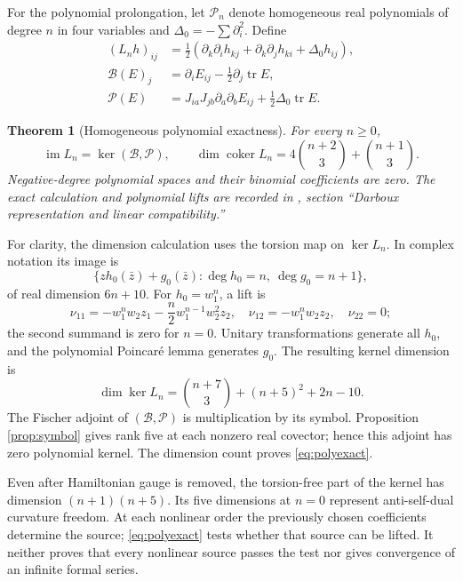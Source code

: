 \documentclass[11pt,a4paper]{article}
\newtheorem{inputtheorem}[theorem]{Theorem}
\theoremstyle{definition}
\theoremstyle{remark}
\newcommand{\tr}{\operatorname{tr}}
\newcommand{\p}{\partial}
\begin{document}
For the polynomial prolongation, let $\mathcal P_n$ denote homogeneous real polynomials of degree $n$ in four variables and $\Delta_0=-\sum\p_i^2$. Define
\begin{align*}
 (L_nh)_{ij}&=\frac12(\p_k\p_i h_{kj}+\p_k\p_jh_{ki}+\Delta_0h_{ij}),\\
 \mathscr B(E)_j&=\p_iE_{ij}-\tfrac12\p_j\tr E,\\
 \mathscr P(E)&=J_{ia}J_{jb}\p_a\p_bE_{ij}+\tfrac12\Delta_0\tr E.
\end{align*}
\begin{inputtheorem}[Homogeneous polynomial exactness]\label{input:polynomial}
For every $n\ge0$,
\begin{equation}\label{eq:polyexact}
 \operatorname{im}L_n=\ker(\mathscr B,\mathscr P),\qquad
 \dim\operatorname{coker}L_n=4\binom{n+2}{3}+\binom{n+1}{3}.
\end{equation}
Negative-degree polynomial spaces and their binomial coefficients are zero. The exact calculation and polynomial lifts are recorded in \cite{Repository}, section ``Darboux representation and linear compatibility.''
\end{inputtheorem}
For clarity, the dimension calculation uses the torsion map on $\ker L_n$. In complex notation its image is
\[
 \{z h_0(\bar z)+g_0(\bar z):\deg h_0=n,\ \deg g_0=n+1\},
\]
of real dimension $6n+10$. For $h_0=w_1^n$, a lift is
\[
 \nu_{11}=-w_1^nw_2z_1-\frac n2w_1^{n-1}w_2^2z_2,\quad
 \nu_{12}=-w_1^nw_2z_2,\quad \nu_{22}=0;
\]
the second summand is zero for $n=0$. Unitary transformations generate all $h_0$, and the polynomial Poincar\'e lemma generates $g_0$. The resulting kernel dimension is
\[
 \dim\ker L_n=\binom{n+7}{3}+(n+5)^2+2n-10.
\]
The Fischer adjoint of $(\mathscr B,\mathscr P)$ is multiplication by its symbol. Proposition \ref{prop:symbol} gives rank five at each nonzero real covector; hence this adjoint has zero polynomial kernel. The dimension count proves \eqref{eq:polyexact}.

Even after Hamiltonian gauge is removed, the torsion-free part of the kernel has dimension $(n+1)(n+5)$. Its five dimensions at $n=0$ represent anti-self-dual curvature freedom. At each nonlinear order the previously chosen coefficients determine the source; \eqref{eq:polyexact} tests whether that source can be lifted. It neither proves that every nonlinear source passes the test nor gives convergence of an infinite formal series.
\end{document}
